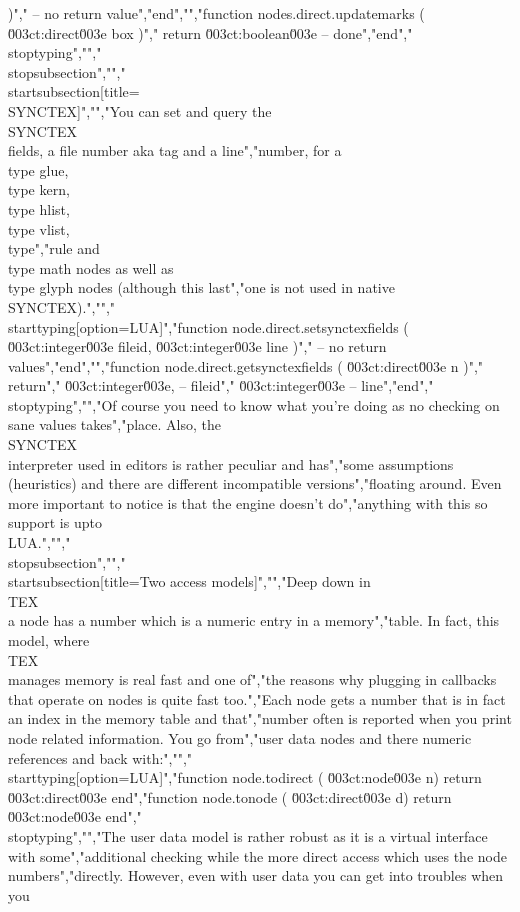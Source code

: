 )","    -- no return value","end","","function nodes.direct.updatemarks ( \u003ct:direct\u003e box )","    return \u003ct:boolean\u003e -- done","end","\\stoptyping","","\\stopsubsection","","\\startsubsection[title={\\SYNCTEX}]","","You can set and query the \\SYNCTEX\\ fields, a file number aka tag and a line","number, for a \\type {glue}, \\type {kern}, \\type {hlist}, \\type {vlist}, \\type","{rule} and \\type {math} nodes as well as \\type {glyph} nodes (although this last","one is not used in native \\SYNCTEX).","","\\starttyping[option=LUA]","function node.direct.setsynctexfields ( \u003ct:integer\u003e fileid, \u003ct:integer\u003e line )","    -- no return values","end","","function node.direct.getsynctexfields ( \u003ct:direct\u003e n )","    return","        \u003ct:integer\u003e, -- fileid","        \u003ct:integer\u003e  -- line","end","\\stoptyping","","Of course you need to know what you're doing as no checking on sane values takes","place. Also, the \\SYNCTEX\\ interpreter used in editors is rather peculiar and has","some assumptions (heuristics) and there are different incompatible versions","floating around. Even more important to notice is that the engine doesn't do","anything with this so support is upto \\LUA.","","\\stopsubsection","","\\startsubsection[title={Two access models}]","","Deep down in \\TEX\\ a node has a number which is a numeric entry in a memory","table. In fact, this model, where \\TEX\\ manages memory is real fast and one of","the reasons why plugging in callbacks that operate on nodes is quite fast too.","Each node gets a number that is in fact an index in the memory table and that","number often is reported when you print node related information. You go from","user data nodes and there numeric references and back with:","","\\starttyping[option=LUA]","function node.todirect ( \u003ct:node\u003e   n) return \u003ct:direct\u003e end","function node.tonode   ( \u003ct:direct\u003e d) return \u003ct:node\u003e   end","\\stoptyping","","The user data model is rather robust as it is a virtual interface with some","additional checking while the more direct access which uses the node numbers","directly. However, even with user data you can get into troubles when you 